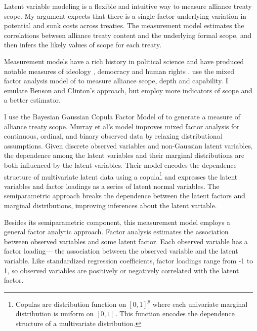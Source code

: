 \documentclass[12pt]{article}
\begin{document}
Latent variable modeling is a flexible and intuitive way to measure alliance treaty scope. 
My argument expects that there is a single factor underlying variation in potential and sunk costs across treaties.  
The measurement model estimates the correlations between alliance treaty content and the underlying formal scope, and then infers the likely values of scope for each treaty. 


Measurement models have a rich history in political science and have produced notable measures of ideology \citep{Clintonetal2004}, democracy \citep{TreierJackman2008} and human rights \citep{Fariss2014}. 
\citet{BensonClinton2016} use the mixed factor analysis model of \citet{Quinn2004} to measure alliance scope, depth and capability.
I emulate Benson and Clinton's approach, but employ more indicators of scope and a better estimator. 


I use the Bayesian Gaussian Copula Factor Model of \citet{Murrayetal2013} to generate a measure of alliance treaty scope. 
Murray et al's model improves mixed factor analysis for continuous, ordinal, and binary observed data by relaxing distributional assumptions. 
Given discrete observed variables and non-Gaussian latent variables, the dependence among the latent variables and their marginal distributions are both influenced by the latent variables.
Their model encodes the dependence structure of multivariate latent data using a copula\footnote{Copulas are distribution function on $[0, 1]^p$ where each univariate marginal distribution is uniform on $[0,1]$. This function encodes the dependence structure of a multivariate distribution.} and expresses the latent variables and factor loadings as a series of latent normal variables. 
The semiparametric approach breaks the dependence between the latent factors and marginal distributions, improving inferences about the latent variable. 


Besides its semiparametric component, this measurement model employs a general factor analytic approach.
Factor analysis estimates the association between observed variables and some latent factor.
Each observed variable has a factor loading--- the association between the observed variable and the latent variable.  
Like standardized regression coefficients, factor loadings range from -1 to 1, so observed variables are positively or negatively correlated with the latent factor.  
\end{document}

